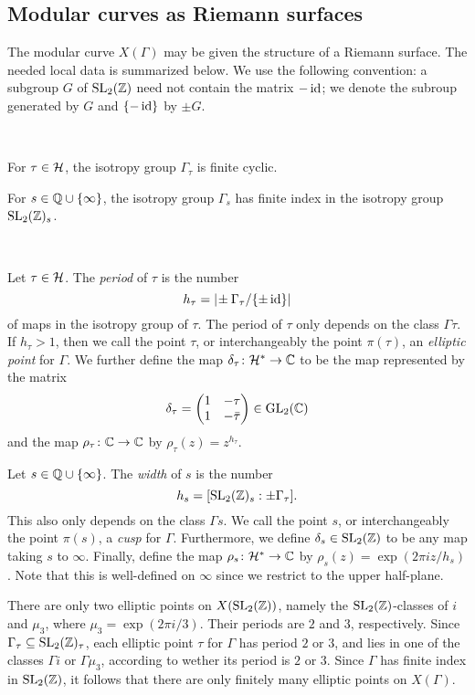 \subsection{Modular curves as Riemann surfaces}

The modular curve $X(\Gamma)$ may be given the structure of a Riemann surface. The needed local data is summarized below. We use the following convention: a subgroup $G$ of $\operatorname{SL}_2(\mathbb{Z})$ need not contain the matrix $-\operatorname{id}$; we denote the subroup generated by $G$ and $\{-\operatorname{id}\}$ by $\pm G$.

\begin{prop} \ 

  For $\tau\in\mathcal{H}$, the isotropy group $\Gamma_\tau$ is finite cyclic.
 
  For $s\in\mathbb{Q}\cup\{\infty\}$, the isotropy group $\Gamma_s$ has finite index in the isotropy group $\operatorname{SL}_2(\mathbb{Z})_s$.
\end{prop}

\begin{defi} \

  Let $\tau\in\mathcal{H}$. The \emph{period} of $\tau$ is the number \[h_\tau=|\!\pm\Gamma_\tau/\{\pm\operatorname{id}\}|\] of maps in the isotropy group of $\tau$. The period of $\tau$ only depends on the class $\Gamma\tau$. If $h_\tau > 1$, then we call the point $\tau$, or interchangeably the point $\pi(\tau)$, an \emph{elliptic point} for $\Gamma$. We further define the map $\delta_\tau\colon\mathcal{H}^*\to\mathbb{C}$ to be the map represented by the matrix
 \[\delta_\tau = \begin{pmatrix}1 & -\tau \\ 1 & -\bar{\tau}\end{pmatrix}\in\operatorname{GL}_2(\mathbb{C})\] and the map $\rho_\tau\colon\mathbb{C}\to\mathbb{C}$ by $\rho_\tau(z)=z^{h_\tau}.$
 
  Let $s\in\mathbb{Q}\cup\{\infty\}$. The \emph{width} of $s$ is the number \[h_s=[\operatorname{SL}_2(\mathbb{Z})_s:\pm\Gamma_\tau].\] This also only depends on the class $\Gamma s$. We call the point $s$, or interchangeably the point $\pi(s)$, a \emph{cusp} for $\Gamma$. Furthermore, we define $\delta_s\in\operatorname{SL}_2(\mathbb{Z})$ to be any map taking $s$ to $\infty$. Finally, define the map $\rho_s\colon\mathcal{H}^*\to\mathbb{C}$ by $\rho_s(z)=\exp(2\pi iz/h_s)$. Note that this is well-defined on $\infty$ since we restrict to the upper half-plane.
\end{defi}

\begin{rmk}
 There are only two elliptic points on $X(\operatorname{SL}_2(\mathbb{Z}))$, namely the $\operatorname{SL}_2(\mathbb{Z})$-classes of $i$ and $\mu_3$, where $\mu_3=\exp(2\pi i/3)$. Their periods are $2$ and $3$, respectively. Since $\Gamma_\tau\subseteq\operatorname{SL}_2(\mathbb{Z})_\tau$, each elliptic point $\tau$ for $\Gamma$ has period $2$ or $3$, and lies in one of the classes $\Gamma i$ or $\Gamma \mu_3$, according to wether its period is $2$ or $3$. Since $\Gamma$ has finite index in $\operatorname{SL}_2(\mathbb{Z})$, it follows that there are only finitely many elliptic points on $X(\Gamma)$.
\end{rmk}

